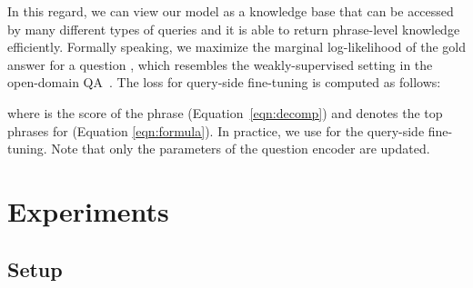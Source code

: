 \documentclass[11pt,a4paper]{article}
\begin{document}
In this regard, we can view our model as a knowledge base that can be accessed by many different types of queries and it is able to return phrase-level knowledge efficiently.
Formally speaking, we maximize the marginal log-likelihood of the gold answer  for a question , which resembles the weakly-supervised setting in the open-domain QA~\citep{lee2019latent,min2019discrete}.
The loss for query-side fine-tuning is computed as follows:

where  is the score of the phrase  (Equation~\eqref{eqn:decomp}) and  denotes the top  phrases for  (Equation \eqref{eqn:formula}).
In practice, we use  for the query-side fine-tuning.
Note that only the parameters of the question encoder  are updated.


\begin{comment}
It is important to note that for adapting retriever-reader models (such as DPR~\citep{karpukhin2020dense}) to new types of questions, we need to re-train the reader model as well as the question (and possibly the passage) encoder of the retriever model.
However, when the size of the training set is relatively small, it would be cumbersome to train a reader model using only a small amount of data.\footnote{For instance, the performance of DPR-single on the small sized dataset (TREC, WebQuestions) is relatively low and the reader model in DPR-multi is pre-trained on larger datasets before training on TREC or WebQuestions.}
On the other hand, with the query-side fine-tuning, we can easily adapt our model to new questions since we only have to update the question encoder, which can also was also trained on large QA datasets.
\end{comment}











 

\section{Experiments}
\label{sec:experiments}










\subsection{Setup}
\end{document}
